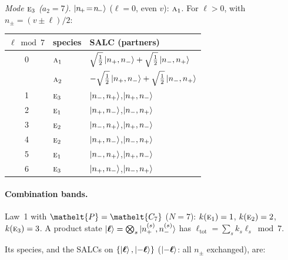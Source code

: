 \documentclass[11pt]{article}
\newcommand{\eltfont}[1]{{\let\sigma\eltsigma\mathelt{#1}}}
\newcommand{\irr}[1]{\text{\normalfont\scshape #1}}
\newcommand{\elt}[1]{\eltfont{#1}}
\newcommand{\pel}{\elt{P}}             %
\begin{document}
\emph{Mode $\irr{e}_{3}$ ($a_2=7$).} $\ket{n_{\!+}\!=\!n_{\!-}}$ ($\ell=0$, even $v$): $\irr{a}_{1}$. For $\ell>0$, with $n_\pm=(v\pm\ell)/2$:
\begin{longtable}{c l l}\hline $\ell\bmod 7$ & species & SALC (partners)\\ \hline\endhead
0 & $\irr{a}_{1}$ & $\sqrt{\tfrac{1}{2}}\ket{n_+,n_-}+\sqrt{\tfrac{1}{2}}\ket{n_-,n_+}$\\
 & $\irr{a}_{2}$ & $-\sqrt{\tfrac{1}{2}}\ket{n_+,n_-}+\sqrt{\tfrac{1}{2}}\ket{n_-,n_+}$\\
1 & $\irr{e}_{3}$ & $\ket{n_-,n_+}$,\quad $\ket{n_+,n_-}$\\
2 & $\irr{e}_{1}$ & $\ket{n_+,n_-}$,\quad $\ket{n_-,n_+}$\\
3 & $\irr{e}_{2}$ & $\ket{n_-,n_+}$,\quad $\ket{n_+,n_-}$\\
4 & $\irr{e}_{2}$ & $\ket{n_+,n_-}$,\quad $\ket{n_-,n_+}$\\
5 & $\irr{e}_{1}$ & $\ket{n_-,n_+}$,\quad $\ket{n_+,n_-}$\\
6 & $\irr{e}_{3}$ & $\ket{n_+,n_-}$,\quad $\ket{n_-,n_+}$\\
\hline\end{longtable}

\paragraph{Combination bands.}

Law~1 with $\pel=\elt{C_{7}}$ ($N=7$): $k(\irr{e}_{1})=1$, $k(\irr{e}_{2})=2$, $k(\irr{e}_{3})=3$. A product state $\ket{\boldsymbol\ell}=\bigotimes_s\ket{n_+^{(s)},n_-^{(s)}}$ has $\ell_{\mathrm{tot}}=\sum_sk_s\ell_s\bmod 7$.

Its species, and the SALCs on $\{\ket{\boldsymbol\ell},\ket{-\boldsymbol\ell}\}$ ($\ket{-\boldsymbol\ell}$: all $n_\pm$ exchanged), are:
\end{document}
